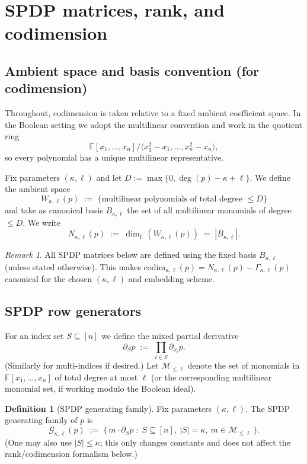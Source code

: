 \documentclass[12pt]{article}
\theoremstyle{definition}
\newtheorem{definition}[theorem]{Definition}
\theoremstyle{remark}
\newtheorem{remark}[theorem]{Remark}
\newcommand{\F}{\mathbb{F}}
\begin{document}
\section{SPDP matrices, rank, and codimension}
\label{sec:spdp-matrix-rank-codim}

\subsection{Ambient space and basis convention (for codimension)}
\label{subsec:ambient-basis}

Throughout, codimension is taken relative to a fixed ambient coefficient space.
In the Boolean setting we adopt the multilinear convention and work in the quotient
ring
\[
  \F[x_1,\dots,x_n]/\langle x_1^2-x_1,\dots,x_n^2-x_n\rangle,
\]
so every polynomial has a unique multilinear representative.

Fix parameters $(\kappa,\ell)$ and let $D:=\max\{0,\deg(p)-\kappa+\ell\}$. We define the
ambient space
\[
  W_{\kappa,\ell}(p) \;:=\; \{ \text{multilinear polynomials of total degree }\le D \}
\]
and take as canonical basis $B_{\kappa,\ell}$ the set of all multilinear monomials of
degree $\le D$. We write
\[
  N_{\kappa,\ell}(p) \;:=\; \dim_\F(W_{\kappa,\ell}(p)) \;=\; |B_{\kappa,\ell}|.
\]

\begin{remark}
All SPDP matrices below are defined using the fixed basis $B_{\kappa,\ell}$ (unless stated
otherwise). This makes $\mathrm{codim}_{\kappa,\ell}(p)=N_{\kappa,\ell}(p)-\Gamma_{\kappa,\ell}(p)$
canonical for the chosen $(\kappa,\ell)$ and embedding scheme.
\end{remark}

\subsection{SPDP row generators}
For an index set $S \subseteq [n]$ we define the mixed partial derivative
\[
  \partial_S p \;:=\; \displaystyle\prod_{i \in S} \partial_{x_i} p.
\]
(Similarly for multi-indices if desired.)
Let $\mathcal{M}_{\le \ell}$ denote the set of monomials in $\F[x_1,\dots,x_n]$ of
total degree at most $\ell$ (or the corresponding multilinear monomial set, if working
modulo the Boolean ideal).

\begin{definition}[SPDP generating family]
\label{def:spdp-generators}
Fix parameters $(\kappa,\ell)$. The SPDP generating family of $p$ is
\[
  \mathcal{G}_{\kappa,\ell}(p)
  \;:=\;
  \{\, m \cdot \partial_S p \;:\; S \subseteq [n],\ |S| = \kappa,\ m \in \mathcal{M}_{\le \ell} \,\}.
\]
(One may also use $|S|\le \kappa$; this only changes constants and does not affect the
rank/codimension formalism below.)
\end{definition}
\end{document}
